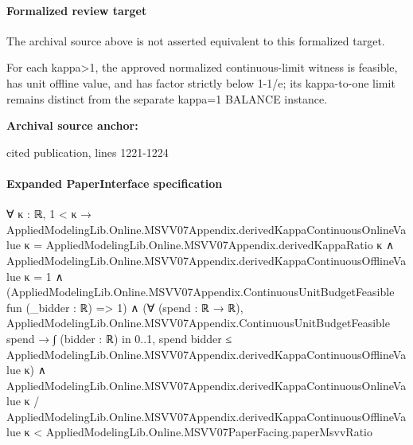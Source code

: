 \documentclass[10pt]{article}
\begin{document}
\paragraph{Formalized review target}
The archival source above is not asserted equivalent to this formalized target.
\begin{ReviewVerbatim}
For each kappa>1, the approved normalized continuous-limit witness is feasible, has unit offline value, and has factor strictly below 1-1/e; its kappa-to-one limit remains distinct from the separate kappa=1 BALANCE instance.
\end{ReviewVerbatim}

\textbf{Archival source anchor:} {\footnotesize\raggedright cited publication, lines 1221-\allowbreak{}1224\par}
\paragraph{Expanded PaperInterface specification}
\begin{ReviewVerbatim}
∀ {κ : ℝ},
  1 < κ →
    AppliedModelingLib.Online.MSVV07Appendix.derivedKappaContinuousOnlineValue κ =
        AppliedModelingLib.Online.MSVV07Appendix.derivedKappaRatio κ ∧
      AppliedModelingLib.Online.MSVV07Appendix.derivedKappaContinuousOfflineValue κ = 1 ∧
        (AppliedModelingLib.Online.MSVV07Appendix.ContinuousUnitBudgetFeasible fun (_bidder : ℝ) => 1) ∧
          (∀ (spend : ℝ → ℝ),
              AppliedModelingLib.Online.MSVV07Appendix.ContinuousUnitBudgetFeasible spend →
                ∫ (bidder : ℝ) in 0..1, spend bidder ≤
                  AppliedModelingLib.Online.MSVV07Appendix.derivedKappaContinuousOfflineValue κ) ∧
            AppliedModelingLib.Online.MSVV07Appendix.derivedKappaContinuousOnlineValue κ /
                AppliedModelingLib.Online.MSVV07Appendix.derivedKappaContinuousOfflineValue κ <
              AppliedModelingLib.Online.MSVV07PaperFacing.paperMsvvRatio
\end{ReviewVerbatim}
\end{document}
